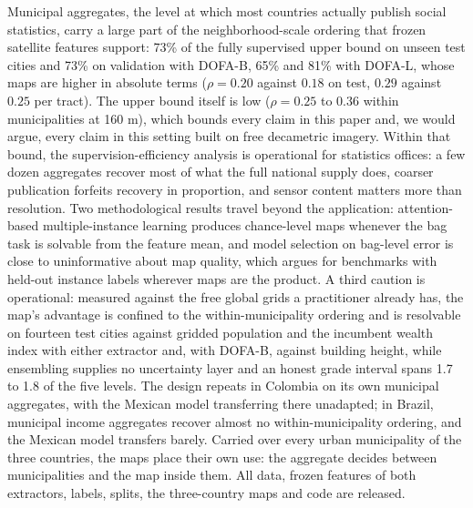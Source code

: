 \documentclass[11pt]{article}
\begin{document}
Municipal aggregates, the level at which most countries actually publish social
statistics, carry a large part of the neighborhood-scale ordering that frozen satellite
features support: 73\% of the fully supervised upper bound on unseen test cities and
73\% on validation with DOFA-B, 65\% and 81\% with DOFA-L, whose maps are higher in
absolute terms ($\rho = 0.20$ against $0.18$ on test, $0.29$ against $0.25$ per tract).
The upper bound itself is low ($\rho = 0.25$ to $0.36$ within municipalities at 160 m),
which bounds every claim in this paper and, we would argue, every claim in this setting
built on free decametric imagery. Within that bound, the supervision-efficiency analysis
is operational for statistics offices: a few dozen aggregates recover most of what the
full national supply does, coarser publication forfeits recovery in proportion, and
sensor content matters more than resolution. Two methodological results travel beyond
the application: attention-based multiple-instance learning produces chance-level maps
whenever the bag task is solvable from the feature mean, and model selection on
bag-level error is close to uninformative about map quality, which argues for
benchmarks with held-out instance labels wherever maps are the product. A third caution
is operational: measured against the free global grids a practitioner already has, the
map's advantage is confined to the within-municipality ordering and is resolvable on
fourteen test cities against gridded population and the incumbent wealth index with
either extractor and, with DOFA-B, against building height, while ensembling supplies
no uncertainty layer and an honest grade interval spans 1.7 to 1.8 of the five levels.
The design repeats in Colombia on its own municipal aggregates, with the Mexican model
transferring there unadapted; in Brazil, municipal income aggregates recover almost no
within-municipality ordering, and the Mexican model transfers barely. Carried over
every urban municipality of the three countries, the maps place their own use: the
aggregate decides between municipalities and the map inside them. All data, frozen
features of both extractors, labels, splits, the three-country maps and code are
released.
\end{document}
